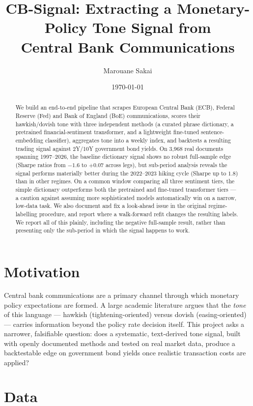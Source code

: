 \documentclass[11pt]{article}
\title{CB-Signal: Extracting a Monetary-Policy Tone Signal from\\
Central Bank Communications}
\author{Marouane Sakai}
\date{\today}
\begin{document}
\maketitle

\begin{abstract}
We build an end-to-end pipeline that scrapes European Central Bank (ECB),
Federal Reserve (Fed) and Bank of England (BoE) communications, scores
their hawkish/dovish tone with three independent methods (a curated
phrase dictionary, a pretrained financial-sentiment transformer, and a
lightweight fine-tuned sentence-embedding classifier), aggregates tone
into a weekly index, and backtests a resulting trading signal against
2Y/10Y government bond yields. On 3,968 real documents spanning
1997--2026, the baseline dictionary signal shows no robust full-sample
edge (Sharpe ratios from $-1.6$ to $+0.07$ across legs), but sub-period
analysis reveals the signal performs materially better during the
2022--2023 hiking cycle (Sharpe up to $1.8$) than in other regimes. On a
common window comparing all three sentiment tiers, the simple dictionary
outperforms both the pretrained and fine-tuned transformer tiers --- a
caution against assuming more sophisticated models automatically win on a
narrow, low-data task. We also document and fix a look-ahead issue in the
original regime-labelling procedure, and report where a walk-forward
refit changes the resulting labels. We report all of this plainly,
including the negative full-sample result, rather than presenting only
the sub-period in which the signal happens to work.
\end{abstract}

\section{Motivation}

Central bank communications are a primary channel through which monetary
policy expectations are formed. A large academic literature
\citep{apel2012information,hansen2016shocking,bennani2017home} argues that
the \emph{tone} of this language --- hawkish (tightening-oriented) versus
dovish (easing-oriented) --- carries information beyond the policy rate
decision itself. This project asks a narrower, falsifiable question: does a
systematic, text-derived tone signal, built with openly documented methods
and tested on real market data, produce a backtestable edge on government
bond yields once realistic transaction costs are applied?

\section{Data}
\end{document}
